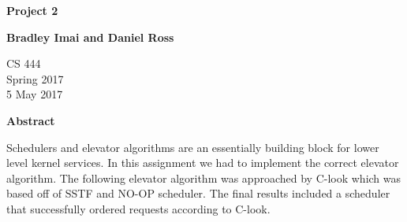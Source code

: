 \documentclass[letterpaper,10pt,titlepage]{article}
\begin{document}
\begin{titlepage}
    \begin{center}
        \vspace*{3.5cm}

        \textbf{Project 2}

        \vspace{0.5cm}

        \textbf{Bradley Imai and Daniel Ross}

        \vspace{0.8cm}

        CS 444\\
        Spring 2017\\
        5 May 2017\\

        \vspace{1cm}

        \textbf{Abstract}\\

        \vspace{0.5cm}

        Schedulers and elevator algorithms are an essentially building block for lower level kernel services. In this assignment we had to implement the correct elevator algorithm. The following elevator algorithm was approached by C-look which was based off of SSTF and NO-OP scheduler. The final results included a scheduler that successfully ordered requests according to C-look.\vfill


    \end{center}
\end{titlepage}

\newpage
\end{document}
